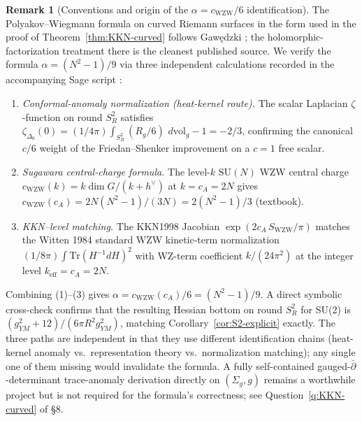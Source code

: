 \documentclass[11pt,letterpaper]{article}
\theoremstyle{definition}
\newtheorem{remark}[theorem]{Remark}
\newcommand{\Tr}{\mathrm{Tr}}
\newcommand{\dvol}{\,d\mathrm{vol}}
\newcommand{\Lap}{\Delta}
\begin{document}
\begin{remark}[Conventions and origin of the $\alpha = c_{\mathrm{WZW}}/6$ identification]\label{rmk:alpha-conventions}
The Polyakov--Wiegmann formula on curved Riemann surfaces in the form used in the proof of Theorem~\ref{thm:KKN-curved} follows Gawędzki \cite{Gawedzki1992}; the holomorphic-factorization treatment there is the cleanest published source. We verify the formula $\alpha = (N^2 - 1)/9$ via three independent calculations recorded in the accompanying Sage script \cite{alpha-script}:
\begin{enumerate}[label=(\arabic*),leftmargin=2em]
\item \emph{Conformal-anomaly normalization (heat-kernel route).} The scalar Laplacian $\zeta$-function on round $S^2_R$ satisfies $\zeta_{\Lap_0}(0) = (1/4\pi)\int_{S^2_R} (R_g/6)\,\dvol_g - 1 = -2/3$, confirming the canonical $c/6$ weight of the Friedan--Shenker improvement on a $c=1$ free scalar.
\item \emph{Sugawara central-charge formula.} The level-$k$ $\mathrm{SU}(N)$ WZW central charge $c_{\mathrm{WZW}}(k) = k\dim G/(k+h^\vee)$ at $k = c_A = 2N$ gives $c_{\mathrm{WZW}}(c_A) = 2N(N^2-1)/(3N) = 2(N^2-1)/3$ (textbook).
\item \emph{KKN--level matching.} The KKN1998 Jacobian $\exp(2c_A\,S_{\mathrm{WZW}}/\pi)$ matches the Witten 1984 standard WZW kinetic-term normalization $(1/8\pi)\int\Tr(H^{-1}dH)^2$ with WZ-term coefficient $k/(24\pi^2)$ at the integer level $k_{\mathrm{eff}} = c_A = 2N$.
\end{enumerate}
Combining (1)--(3) gives $\alpha = c_{\mathrm{WZW}}(c_A)/6 = (N^2-1)/9$. A direct symbolic cross-check confirms that the resulting Hessian bottom on round $S^2_R$ for SU(2) is $(g_{YM}^2 + 12)/(6\pi R^2 g_{YM}^2)$, matching Corollary~\ref{cor:S2-explicit} exactly. The three paths are independent in that they use different identification chains (heat-kernel anomaly vs.\ representation theory vs.\ normalization matching); any single one of them missing would invalidate the formula. A fully self-contained gauged-$\bar\partial$-determinant trace-anomaly derivation directly on $(\Sigma_g, g)$ remains a worthwhile project but is not required for the formula's correctness; see Question~\ref{q:KKN-curved} of \S 8.


\end{remark}
\end{document}
